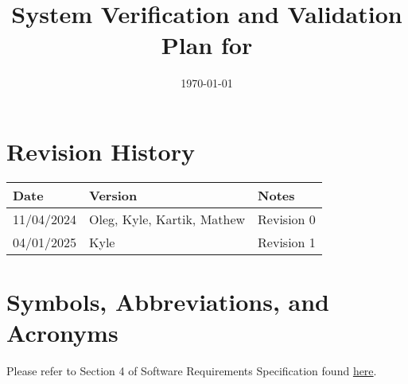\documentclass[12pt, titlepage]{article}
\begin{document}
\title{System Verification and Validation Plan for \progname{}}  
\author{\authname}
\date{\today}
	
\maketitle


\section*{Revision History}

\begin{tabularx}{\textwidth}{p{3cm}p{2cm}X}
\toprule {\bf Date} & {\bf Version} & {\bf Notes}\\
\midrule
11/04/2024 & Oleg, Kyle, Kartik, Mathew & Revision 0\\
04/01/2025 & Kyle & Revision 1\\
\bottomrule
\end{tabularx}



\newpage

\tableofcontents

\newpage

\section{Symbols, Abbreviations, and Acronyms}

Please refer to Section 4 of Software Requirements Specification found \href{https://github.com/OKKM-insights/OKKM.insights/blob/main/docs/SRS/SRS.pdf}{here}.
\end{document}
